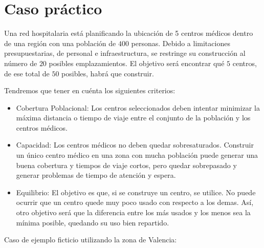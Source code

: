 \documentclass[12pt,a4paper]{book}
\begin{document}
\section{Caso práctico}

Una red hospitalaria está planificando la ubicación de 5 centros médicos dentro de una región con una población de $400$ personas. Debido a limitaciones presupuestarias, de personal e infraestructura, se restringe su construcción al número de $20$ posibles emplazamientos. El objetivo será encontrar qué $5$ centros, de ese total de $50$ posibles, habrá que construir.

Tendremos que tener en cuénta los siguientes criterios:

\begin{itemize}
    \item Cobertura Poblacional: Los centros seleccionados deben intentar minimizar la máxima distancia o tiempo de viaje entre el conjunto de la población y los centros médicos.
    \item Capacidad: Los centros médicos no deben quedar sobresaturados. Construir un único centro médico en una zona con mucha población puede generar una buena cobertura y tiempos de viaje cortos, pero quedar sobrepasado y generar problemas de tiempo de atención y espera.
    \item Equilibrio: El objetivo es que, si se construye un centro, se utilice. No puede ocurrir que un centro quede muy poco usado con respecto a los demas. Así, otro objetivo será que la diferencia entre los más usados y los menos sea la mínima posible, quedando su uso bien repartido.
\end{itemize}
Caso de ejemplo ficticio utilizando la zona de Valencia:
\end{document}
